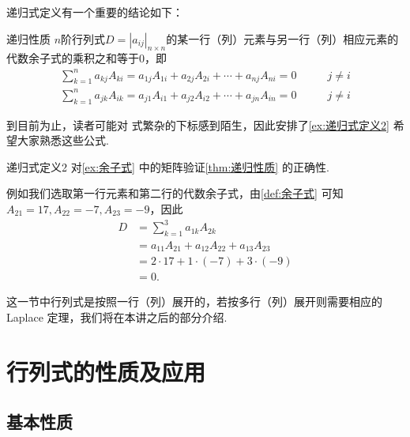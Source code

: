 递归式定义有一个重要的结论如下：
\begin{theorem}{}{递归性质}
    $n$阶行列式$D=|a_{ij}|_{n \times n}$的某一行（列）元素与另一行（列）相应元素的代数余子式的乘积之和等于0，即
    \begin{align}
        \label{eq:13:递归式定义3}
        \sum_{k=1}^{n}a_{kj}A_{ki}=a_{1j}A_{1i}+a_{2j}A_{2i}+\cdots+a_{nj}A_{ni}=0 & \qquad j \neq i \\
        \label{eq:13:递归式定义4}
        \sum_{k=1}^{n}a_{jk}A_{ik}=a_{j1}A_{i1}+a_{j2}A_{i2}+\cdots+a_{jn}A_{in}=0 & \qquad j \neq i
    \end{align}
\end{theorem}

到目前为止，读者可能对 式繁杂的下标感到陌生，因此安排了\autoref{ex:递归式定义2} 希望大家熟悉这些公式.
\begin{example}{}{递归式定义2}
    对\autoref{ex:余子式} 中的矩阵验证\autoref{thm:递归性质} 的正确性.
\end{example}

\begin{solution}
    例如我们选取第一行元素和第二行的代数余子式，由\autoref{def:余子式} 可知$A_{21}=17,A_{22}=-7,A_{23}=-9$，因此
    \begin{align*}
        D & =\sum_{k=1}^{3}a_{1k}A_{2k}             \\
          & =a_{11}A_{21}+a_{12}A_{22}+a_{13}A_{23} \\
          & =2 \cdot 17+1 \cdot (-7)+3 \cdot (-9)   \\
          & =0.
    \end{align*}
\end{solution}

这一节中行列式是按照一行（列）展开的，若按多行（列）展开则需要相应的 Laplace 定理，我们将在本讲之后的部分介绍.

\section{行列式的性质及应用}

\subsection{基本性质}

